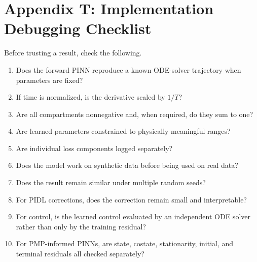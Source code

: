 \documentclass[11pt,a4paper]{article}
\begin{document}
\section{Appendix T: Implementation Debugging Checklist}
Before trusting a result, check the following.
\begin{enumerate}[leftmargin=2em]
    \item Does the forward PINN reproduce a known ODE-solver trajectory when parameters are fixed?
    \item If time is normalized, is the derivative scaled by $1/T$?
    \item Are all compartments nonnegative and, when required, do they sum to one?
    \item Are learned parameters constrained to physically meaningful ranges?
    \item Are individual loss components logged separately?
    \item Does the model work on synthetic data before being used on real data?
    \item Does the result remain similar under multiple random seeds?
    \item For PIDL corrections, does the correction remain small and interpretable?
    \item For control, is the learned control evaluated by an independent ODE solver rather than only by the training residual?
    \item For PMP-informed PINNs, are state, costate, stationarity, initial, and terminal residuals all checked separately?
\end{enumerate}
\end{document}
